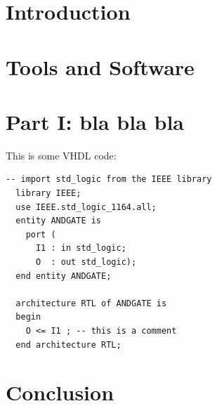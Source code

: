 \documentclass{myDocClass}
\begin{document}

\section{Introduction}
\lipsum[1-1]

\section{Tools and Software}
\blindenumerate[4]

\section{Part I: bla bla bla}
\lipsum[1-1]

This is some VHDL code:

\begin{lstlisting}[style=vhdl, title = "Title here"]
  -- import std_logic from the IEEE library
  library IEEE;
  use IEEE.std_logic_1164.all;
  entity ANDGATE is
    port ( 
      I1 : in std_logic;
      O  : out std_logic);
  end entity ANDGATE;
 
  architecture RTL of ANDGATE is
  begin
    O <= I1 ; -- this is a comment
  end architecture RTL;
  \end{lstlisting}

  

\section{Conclusion}
\lipsum[1-1]
\end{document}
